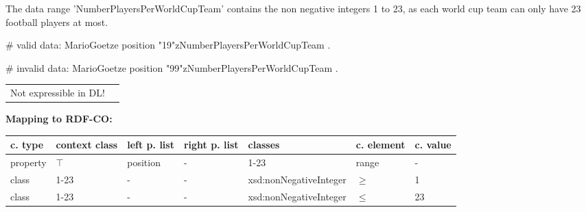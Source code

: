 \documentclass{llncs}
\newcommand{\ms}[1]{\texttt{#1}}
\newenvironment{gcotable}{
  \scriptsize
  \sffamily
  \vspace{0cm}
	\begin{center}
	\textbf{\vspace{0.4cm}Mapping to RDF-CO:} \\
  \begin{tabular}{l|l|l|l|l|l|l}
	\hline
  \textbf{c. type} & \textbf{context class} & \textbf{left p. list} & \textbf{right p. list} & \textbf{classes} & \textbf{c. element} & \textbf{c. value} \\
  \hline

}{
  \hline
  \end{tabular}
	\end{center}
}
\newenvironment{DL}{
  \vspace{0cm}
	\begin{center}
  \begin{tabular}{r l}

}{
  \end{tabular}
	\end{center}
}
\begin{document}
The data range 'NumberPlayersPerWorldCupTeam' contains the non negative integers 1 to 23, as each world cup team can only have 23 football players at most.

\begin{ex}
# valid data:
MarioGoetze
    position "19"^^:NumberPlayersPerWorldCupTeam .
\end{ex}

\begin{ex}
# invalid data:
MarioGoetze
    position "99"^^:NumberPlayersPerWorldCupTeam .
\end{ex}



\begin{DL}
Not expressible in DL!
\end{DL}

%

\begin{gcotable}
property & $\top$ & position & - & 1-23 & range & - \\
class & 1-23 & - & - & xsd:nonNegativeInteger & $\geq$ & 1 \\
class & 1-23 & - & - & xsd:nonNegativeInteger & $\leq$ & 23 \\
\end{gcotable}

%
\end{document}
